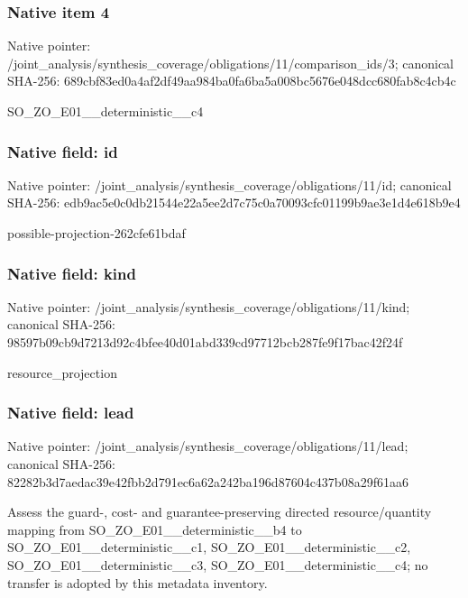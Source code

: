 \documentclass[10pt,a4paper]{article}
\begin{document}
\subsubsection{Native item 4}
Native pointer: /joint\_\allowbreak{}analysis/synthesis\_\allowbreak{}coverage/obligations/11/comparison\_\allowbreak{}ids/3; canonical SHA-256: 689cbf83ed0a4af2df49aa984ba0fa6ba5a008bc5676e048dcc680fab8c4cb4c

\begingroup\raggedright\sloppy SO\_\allowbreak{}ZO\_\allowbreak{}E01\_\allowbreak{}\_\allowbreak{}deterministic\_\allowbreak{}\_\allowbreak{}c4\par\endgroup

\subsubsection{Native field: id}
Native pointer: /joint\_\allowbreak{}analysis/synthesis\_\allowbreak{}coverage/obligations/11/id; canonical SHA-256: edb9ac5e0c0db21544e22a5ee2d7c75c0a70093cfc01199b9ae3e1d4e618b9e4

\begingroup\raggedright\sloppy possible-projection-262cfe61bdaf\par\endgroup

\subsubsection{Native field: kind}
Native pointer: /joint\_\allowbreak{}analysis/synthesis\_\allowbreak{}coverage/obligations/11/kind; canonical SHA-256: 98597b09cb9d7213d92c4bfee40d01abd339cd97712bcb287fe9f17bac42f24f

\begingroup\raggedright\sloppy resource\_\allowbreak{}projection\par\endgroup

\subsubsection{Native field: lead}
Native pointer: /joint\_\allowbreak{}analysis/synthesis\_\allowbreak{}coverage/obligations/11/lead; canonical SHA-256: 82282b3d7aedac39e42fbb2d791ec6a62a242ba196d87604c437b08a29f61aa6

\begingroup\raggedright\sloppy Assess the guard-,\allowbreak{} cost- and guarantee-preserving directed resource/\allowbreak{}quantity mapping from SO\_\allowbreak{}ZO\_\allowbreak{}E01\_\allowbreak{}\_\allowbreak{}deterministic\_\allowbreak{}\_\allowbreak{}b4 to SO\_\allowbreak{}ZO\_\allowbreak{}E01\_\allowbreak{}\_\allowbreak{}deterministic\_\allowbreak{}\_\allowbreak{}c1,\allowbreak{} SO\_\allowbreak{}ZO\_\allowbreak{}E01\_\allowbreak{}\_\allowbreak{}deterministic\_\allowbreak{}\_\allowbreak{}c2,\allowbreak{} SO\_\allowbreak{}ZO\_\allowbreak{}E01\_\allowbreak{}\_\allowbreak{}deterministic\_\allowbreak{}\_\allowbreak{}c3,\allowbreak{} SO\_\allowbreak{}ZO\_\allowbreak{}E01\_\allowbreak{}\_\allowbreak{}deterministic\_\allowbreak{}\_\allowbreak{}c4;\allowbreak{} no transfer is adopted by this metadata inventory.\par\endgroup
\end{document}
